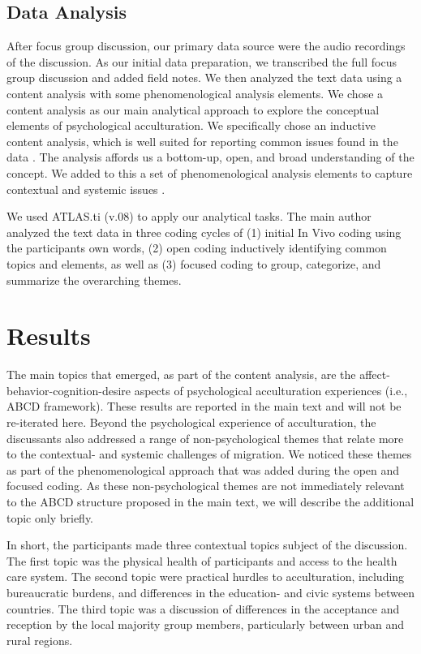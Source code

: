 \documentclass[man, 12pt, a4paper]{apa7}
\begin{document}
\subsection{Data Analysis}

After focus group discussion, our primary data source were the audio recordings of the discussion. As our initial data preparation, we transcribed the full focus group discussion and added field notes. We then analyzed the text data using a content analysis with some phenomenological analysis elements. We chose a content analysis as our main analytical approach to explore the conceptual elements of psychological acculturation. We specifically chose an inductive content analysis, which is well suited for reporting common issues found in the data \citep[][]{Elo2008, Vaismoradi2013}. The analysis affords us a bottom-up, open, and broad understanding of the concept. We added to this a set of phenomenological analysis elements to capture contextual and systemic issues \citep[][]{Cresswell2018}. 

We used ATLAS.ti (v.08) to apply our analytical tasks. The main author analyzed the text data in three coding cycles of (1) initial In Vivo coding using the participants own words, (2) open coding inductively identifying common topics and elements, as well as (3) focused coding to group, categorize, and summarize the overarching themes. 

\section{Results}

The main topics that emerged, as part of the content analysis, are the affect-behavior-cognition-desire aspects of psychological acculturation experiences (i.e., ABCD framework). These results are reported in the main text and will not be re-iterated here. Beyond the psychological experience of acculturation, the discussants also addressed a range of non-psychological themes that relate more to the contextual- and systemic challenges of migration. We noticed these themes as part of the phenomenological approach that was added during the open and focused coding. As these non-psychological themes are not immediately relevant to the ABCD structure proposed in the main text, we will describe the additional topic only briefly. 

In short, the participants made three contextual topics subject of the discussion. The first topic was the physical health of participants and access to the health care system. The second topic were practical hurdles to acculturation, including bureaucratic burdens, and differences in the education- and civic systems between countries. The third topic was a discussion of differences in the acceptance and reception by the local majority group members, particularly between urban and rural regions.
\end{document}
